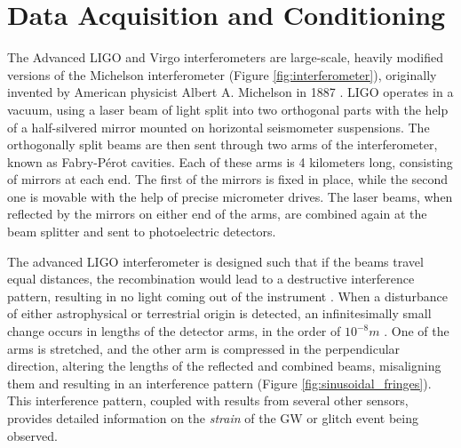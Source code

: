 \documentclass[12pt]{article}
\begin{document}
\pagebreak

\section{Data Acquisition and Conditioning}\label{Data}

\medskip
\noindent The Advanced LIGO and Virgo interferometers are large-scale, heavily modified versions of the Michelson interferometer (Figure \ref{fig:interferometer}), originally invented by American physicist Albert A. Michelson in 1887 \cite{weiss_report_1972,collaboration_gwtc-3_2023}. LIGO operates in a vacuum, using a laser beam of light split into two orthogonal parts with the help of a half-silvered mirror mounted on horizontal seismometer suspensions. The orthogonally split beams are then sent through two arms of the interferometer, known as Fabry-Pérot cavities. Each of these arms is 4 kilometers long, consisting of mirrors at each end. The first of the mirrors is fixed in place, while the second one is movable with the help of precise micrometer drives. The laser beams, when reflected by the mirrors on either end of the arms, are combined again at the beam splitter and sent to photoelectric detectors.

\medskip
\noindent The advanced LIGO interferometer is designed such that if the beams travel equal distances, the recombination would lead to a destructive interference pattern, resulting in no light coming out of the instrument \cite{ligo_what_interferometer}. When a disturbance of either astrophysical or terrestrial origin is detected, an infinitesimally small change occurs in lengths of the detector arms, in the order of $10^{-8}m$ \cite{ghonge_assessing_2024}. One of the arms is stretched, and the other arm is compressed in the perpendicular direction, altering the lengths of the reflected and combined beams, misaligning them and resulting in an interference pattern (Figure \ref{fig:sinusoidal_fringes}). This interference pattern, coupled with results from several other sensors, provides detailed information on the \textit{strain} of the GW or glitch event being observed.
\end{document}
